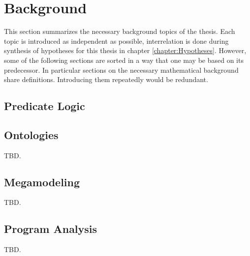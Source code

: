 \chapter{Background}
\label{chapter:Background}
This section summarizes the necessary background topics of the thesis.
Each topic is introduced as independent as possible, interrelation is done during synthesis of hypotheses for this thesis in chapter \ref{chapter:Hypotheses}.
However, some of the following sections are sorted in a way that one may be based on its predecessor.
In particular sections on the necessary mathematical background share definitions.
Introducing them repeatedly would be redundant.


\section{Predicate Logic}






\section{Ontologies}
TBD.
\cite{DBLP:series/ihis/GuarinoOS09}

\section{Megamodeling}
TBD.
\cite{DBLP:conf/sattose/BaggeZ14}
\cite{DBLP:journals/entcs/FavreN05}

\subsection{\megal}
\cite{DBLP:conf/ecmdafa/LammelV14}
\cite{DBLP:conf/models/FavreLV12}
\cite{DBLP:conf/sle/Lammel16}

\subsubsection{\megalxtext}
\cite{LukasHaertelBScThesis}




\section{Program Analysis}
TBD.

